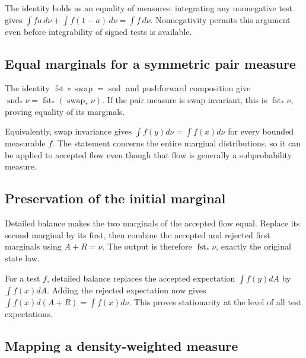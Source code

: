 \documentclass[11pt,a4paper]{report}
\begin{document}
The identity holds as an equality of measures: integrating any nonnegative test gives \(\int f a\,d\nu+\int f(1-a)\,d\nu=\int f\,d\nu\). Nonnegativity permits this argument even before integrability of signed tests is available.

\subsection{\texorpdfstring{Equal marginals for a symmetric pair measure}{Equal marginals for a symmetric pair measure}}
\label{report-step-UnadjustedLangevin-Metropolis-lean-5}


The identity \(\operatorname{fst}\circ\operatorname{swap}=\operatorname{snd}\) and pushforward composition give \(\operatorname{snd}_*\nu=\operatorname{fst}_*(\operatorname{swap}_*\nu)\). If the pair measure is swap invariant, this is \(\operatorname{fst}_*\nu\), proving equality of its marginals.



Equivalently, swap invariance gives \(\int f(y)d\nu=\int f(x)d\nu\) for every bounded measurable \(f\). The statement concerns the entire marginal distributions, so it can be applied to accepted flow even though that flow is generally a subprobability measure.

\subsection{\texorpdfstring{Preservation of the initial marginal}{Preservation of the initial marginal}}
\label{report-step-UnadjustedLangevin-Metropolis-lean-6}


Detailed balance makes the two marginals of the accepted flow equal. Replace its second marginal by its first, then combine the accepted and rejected first marginals using \(A+R=\nu\). The output is therefore \(\operatorname{fst}_*\nu\), exactly the original state law.



For a test \(f\), detailed balance replaces the accepted expectation \(\int f(y)dA\) by \(\int f(x)dA\). Adding the rejected expectation now gives \(\int f(x)d(A+R)=\int f(x)d\nu\). This proves stationarity at the level of all test expectations.

\subsection{\texorpdfstring{Mapping a density-weighted measure}{Mapping a density-weighted measure}}
\label{report-step-UnadjustedLangevin-Metropolis-lean-7}
\end{document}
